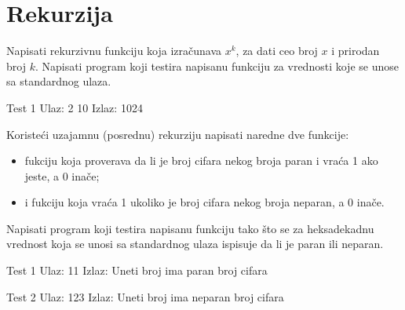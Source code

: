 \section{Rekurzija}


\begin{Exercise}[label=102]
Napisati rekurzivnu funkciju koja izračunava  $x^k$,  za dati ceo broj $x$ i prirodan broj $k$.
Napisati program koji testira napisanu funkciju za vrednosti koje se unose sa standardnog ulaza.
 
\begin{minitest}
\begin{test}{Test 1}
Ulaz:   2 10
Izlaz:  1024
\end{test}
\end{minitest}
\end{Exercise}
\begin{Answer}[ref=102]
\end{Answer}

\begin{Exercise}[label=104]
 Koristeći uzajamnu (posrednu) rekurziju napisati naredne dve funkcije:
 \begin{itemize}
\item fukciju  koja proverava da li je broj cifara nekog broja paran i vraća 1 ako jeste, a 0 inače;
\item i fukciju  koja vraća 1 ukoliko je broj cifara nekog broja neparan, a 0 inače.
 \end{itemize}
 Napisati program koji testira napisanu funkciju tako što se za heksadekadnu vrednost koja se unosi sa standardnog ulaza ispisuje da li je paran ili neparan.
 
\begin{miditest}
\begin{test}{Test 1}
Ulaz:  11
Izlaz: Uneti broj ima paran broj cifara
\end{test}
\end{miditest}
\begin{miditest}
\begin{test}{Test 2}
Ulaz:  123
Izlaz: Uneti broj ima neparan 
       broj cifara
\end{test}
\end{miditest}

\end{Exercise}
\begin{Answer}[ref=104]
\end{Answer}

